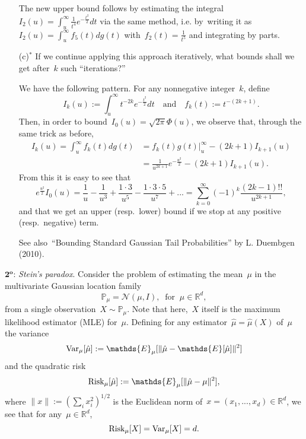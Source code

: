 \documentclass[11pt]{article}
\newcommand{\proofstep}[1]{$\boldsymbol{{#1}^o}$}
\newcommand{\R}{\mathds{R}}
\newcommand{\E}{\mathds{E}}
\newcommand{\cN}{\mathcal{N}}
\newcommand{\Prob}{\mathds{P}}
\newcommand{\Var}{\textup{Var}}
\newcommand{\Risk}{\textup{Risk}}
\newcommand{\vsp}{\vspace{0.3cm}}
\newcommand{\odima}[1]{{\color{red} #1}}
\begin{document}
\begin{itemize}
\odima{The new upper bound follows by estimating the integral~$I_2(u) = \int_{u}^\infty \frac{1}{t^4} e^{-\frac{t^2}{2}} dt$ 
via the same method, i.e. by~writing it as~$I_2(u) = \int_{u}^\infty f_5(t) dg(t)$ with~$f_2(t) = \frac{1}{t^5}$ and integrating by parts.}

\item[(c)$^*$]
If we continue applying this approach iteratively, what bounds shall we get after~$k$ such ``iterations?''

\odima{We have the following pattern. For any nonnegative integer~$k$, define
\[
I_{k}(u) := \int_{u}^\infty t^{-2k} e^{-\frac{t^2}{2}} dt 
\quad \text{and} \quad
f_{k}(t) := t^{-(2k+1)}.
\]
Then, in order to bound~$I_{0}(u) = \sqrt{2 \pi} \Phi(u)$, we observe that, through the same trick as before,
\[
\begin{aligned}
I_{k}(u) 
= \int_{u}^\infty f_{k}(t) dg(t)  
&= f_{k}(t) g(t) \bigg|_{u}^{\infty} - (2k+1) I_{k+1}(u) \\
&= \frac{1}{u^{2k+1}} e^{-\frac{u^2}{2}} - (2k+1) I_{k+1}(u).
\end{aligned}
\]
From this it is easy to see that 
\[
e^{\frac{u^2}{2}} I_{0}(u) 
= \frac{1}{u} - \frac{1}{u^3} + \frac{1 \cdot 3}{u^5} - \frac{1 \cdot 3 \cdot 5}{u^{7}} + ...
= \sum_{k = 0}^{\infty} (-1)^{k} \frac{(2k-1)!!}{u^{2k+1}},
\]
and that we get an upper (resp.~lower) bound if we stop at any positive (resp.~negative) term.

See also~``Bounding Standard Gaussian Tail Probabilities'' by L. Duembgen (2010).
}

\end{itemize}


\vsp

\newpage

\proofstep{2}: {\em Stein's paradox}.
Consider the problem of estimating the mean~$\mu$ in the multivariate Gaussian location family
\begin{equation}
\label{eq:normal-location-family}
\Prob_\mu = \cN(\mu, I), \;\; \text{for} \;\; \mu \in \R^d,
\end{equation}
from a single observation~$X \sim \Prob_\mu$.
Note that here,~$X$ itself is the maximum likelihood estimator (MLE) for~$\mu$. Defining for any estimator~$\hat\mu = \hat \mu(X)$ of~$\mu$ the variance
\[
\Var_{\mu}[\hat\mu] := \E_{\mu}[\|\hat \mu - \E[\hat\mu]\|^2]
\] 
and the quadratic risk
\[
\Risk_{\mu}[\hat\mu] := \E_{\mu}[\|\hat \mu - \mu\|^2],
\] 
where $\|x\| := (\sum_{i} x_i^2)^{1/2}$ is the Euclidean norm of~$x = (x_1,...,x_d) \in \R^d$, we see that for any~$\mu \in \R^d$,
\[
\Risk_{\mu}[X] = \Var_{\mu}[X] = d.
\]
\end{document}
